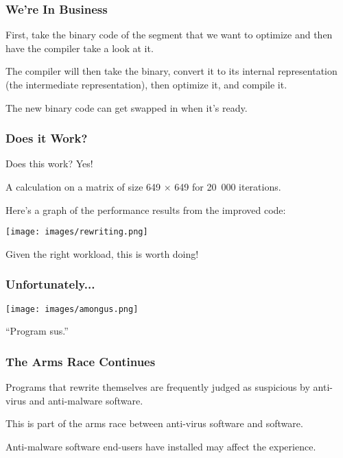 \begin{frame}
\frametitle{We're In Business}

First, take the binary code of the segment that we want to optimize and then have the compiler take a look at it. 

The compiler will then take the binary, convert it to its internal representation (the intermediate representation), then optimize it, and compile it. 

The new binary code can get swapped in when it's ready.

\end{frame}

\begin{frame}
\frametitle{Does it Work?}


Does this work? Yes!

A calculation on a matrix of size 649 $\times$ 649 for 20~000 iterations. 

Here's a graph of the performance results from the improved code:

\begin{center}
	\texttt{[image: images/rewriting.png]}
\end{center}

Given the right workload, this is worth doing!

\end{frame}


\begin{frame}
\frametitle{Unfortunately...}

\begin{center}
	\texttt{[image: images/amongus.png]}
\end{center}

``Program sus.''

\end{frame}

\begin{frame}
\frametitle{The Arms Race Continues}


Programs that rewrite themselves are frequently judged as suspicious by anti-virus and anti-malware software. 

This is part of the arms race between anti-virus software and software.

Anti-malware software end-users have installed may affect the experience.

\end{frame}




